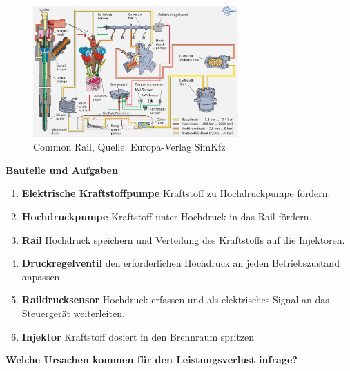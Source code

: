\begin{figure}[!ht]%
\centering
\includegraphics[width=0.7\textwidth]{images/CR/Common-Rail.png}
\caption{Common Rail, Quelle: Europa-Verlag SimKfz}
\end{figure}

\textbf{Bauteile und Aufgaben}

\begin{enumerate}
\item
  \textbf{Elektrische Kraftstoffpumpe} Kraftstoff zu Hochdruckpumpe
  fördern.
\item
  \textbf{Hochdruckpumpe} Kraftstoff unter Hochdruck in das Rail
  fördern.
\item
  \textbf{Rail} Hochdruck speichern und Verteilung des Kraftstoffs auf
  die Injektoren.
\item
  \textbf{Druckregelventil} den erforderlichen Hochdruck an jeden
  Betriebszustand anpassen.
\item
  \textbf{Raildrucksensor} Hochdruck erfassen und als elektrisches
  Signal an das Steuergerät weiterleiten.
\item
  \textbf{Injektor} Kraftstoff dosiert in den Brennraum spritzen
\end{enumerate}

\textbf{Welche Ursachen kommen für den Leistungsverlust infrage?}

